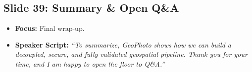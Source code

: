 \documentclass[11pt]{article}
\begin{document}
\subsection{Slide 39: Summary \& Open Q\&A}
\begin{itemize}
    \item \textbf{Focus:} Final wrap-up.
    \item \textbf{Speaker Script:} 
    \textit{``To summarize, GeoPhoto shows how we can build a decoupled, secure, and fully validated geospatial pipeline. Thank you for your time, and I am happy to open the floor to Q\&A.''}
\end{itemize}
\end{document}
